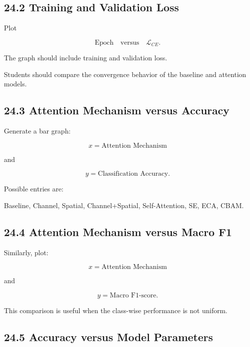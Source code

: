 \documentclass[10pt]{article}
\begin{document}
\subsection*{24.2 Training and Validation Loss}

Plot

\[
\text{Epoch}
\quad\text{versus}\quad
\mathcal{L}_{CE}.
\]

The graph should include training and validation loss.

Students should compare the convergence behavior of the baseline and
attention models.

\subsection*{24.3 Attention Mechanism versus Accuracy}

Generate a bar graph:

\[
x=
\text{Attention Mechanism}
\]

and

\[
y=
\text{Classification Accuracy}.
\]

Possible entries are:

\begin{center}

Baseline,
Channel,
Spatial,
Channel+Spatial,
Self-Attention,
SE,
ECA,
CBAM.

\end{center}

\subsection*{24.4 Attention Mechanism versus Macro F1}

Similarly, plot:

\[
x=
\text{Attention Mechanism}
\]

and

\[
y=
\text{Macro F1-score}.
\]

This comparison is useful when the class-wise performance is not uniform.

\subsection*{24.5 Accuracy versus Model Parameters}
\end{document}
